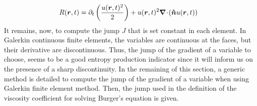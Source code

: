 %
\begin{equation}\label{eq:res_disc2_sct2}
R(\boldsymbol r,t) = \partial_t \left( \frac{u(\boldsymbol r,t)^2}{2} \right) +  u(\boldsymbol r,t)^2 \boldsymbol{\nabla}\! \cdot \! \left( \boldsymbol{\hat{n}} u(\boldsymbol r,t) \right)
\end{equation}
%
It remains, now, to compute the jump $J$ that is set constant in each element. In Galerkin continuous finite elements, the variables are continuous at the faces, but their derivative are discontinuous. Thus, the jump of the gradient of a variable to choose, seems to be a good entropy production indicator since it will inform us on the presence of a sharp discontinuity. In the remaining of this section, a generic method is detailed to compute the jump of the gradient of a variable when using Galerkin finite element method. Then, the jump used in the definition of the viscosity coefficient for solving Burger's equation is given. 


